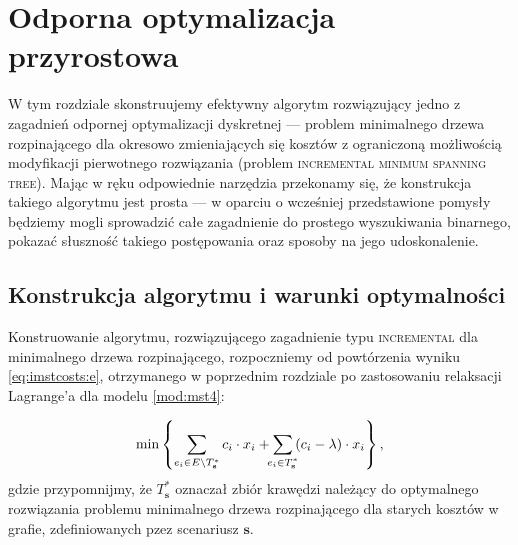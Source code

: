\chapter{Odporna optymalizacja przyrostowa}\label{ch:binaryIncMST}
\thispagestyle{chapterBeginStyle}

W tym rozdziale skonstruujemy efektywny algorytm rozwiązujący jedno z zagadnień odpornej optymalizacji dyskretnej --- problem minimalnego drzewa rozpinającego dla okresowo zmieniających się kosztów z ograniczoną możliwością modyfikacji pierwotnego rozwiązania (problem \textsc{incremental minimum spanning tree}). Mając w ręku odpowiednie narzędzia przekonamy się, że konstrukcja takiego algorytmu jest prosta --- w oparciu o wcześniej przedstawione pomysły będziemy mogli sprowadzić całe zagadnienie do prostego wyszukiwania binarnego, pokazać słuszność takiego postępowania oraz sposoby na jego udoskonalenie.

\section{Konstrukcja algorytmu i warunki optymalności}

Konstruowanie algorytmu, rozwiązującego zagadnienie typu \textsc{incremental} dla minimalnego drzewa rozpinającego, rozpoczniemy od powtórzenia wyniku \ref{eq:imstcosts:e}, otrzymanego w poprzednim rozdziale po zastosowaniu relaksacji Lagrange'a dla modelu \ref{mod:mst4}:

\begin{eqnarray}\label{eq:imstcosts2}
	\min \left\{ \sum_{e_{i} \in E \setminus T^{\ast}_{\textbf{s}}} c_{i} \cdot x_{i} + \sum_{\mathclap{e_{i} \in T^{\ast}_{\textbf{s}}}} \left( c_{i} - \lambda \right) \cdot x_{i} \right\}\text{,}
\end{eqnarray}
gdzie przypomnijmy, że $T^{\ast}_{\textbf{s}}$ oznaczał zbiór krawędzi należący do optymalnego rozwiązania problemu minimalnego drzewa rozpinającego dla starych kosztów w grafie, zdefiniowanych pzez scenariusz $\textbf{s}$.

